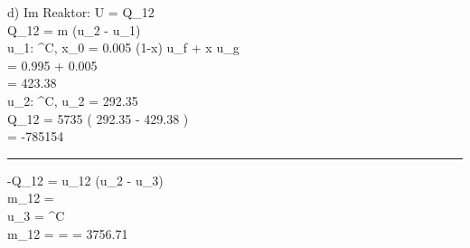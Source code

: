 d) Im Reaktor: \quad \Delta U = Q_{12} \checkmark \\
Q_{12} = m \cdot (u_2 - u_1) \\

u_1: ^\circ C, \quad x_0 = 0.005 \quad {} \quad (1-x) \cdot u_f + x \cdot u_g \\
\quad = 0.995   + 0.005   \\
\quad = 423.38  \\

u_2: ^\circ C, \quad {} \quad {} \quad u_2 = 292.35  \\

Q_{12} = 5735  \left( 292.35  - 429.38  \right) \\
\quad = -785154  \\

\noindent\rule{8cm}{0.4pt}

 \cdot -Q_{12} = \Delta u_{12} (u_2 - u_3) \\
\Delta m_{12} =  \\

u_3 =  ^\circ C \quad {}   \\

\Delta m_{12} =  =  = 3756.71  \\